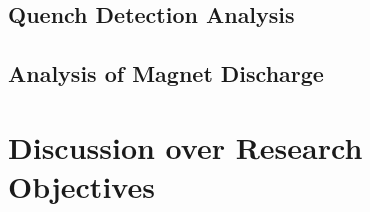 \documentclass[11pt,a4paper]{report}
\begin{document}
\section{Quench Detection Analysis}
% 

\section{Analysis of Magnet Discharge}
% 

\clearpage
\chapter{Discussion over Research Objectives}
\label{chapter:research_questions_discussions}
\end{document}
